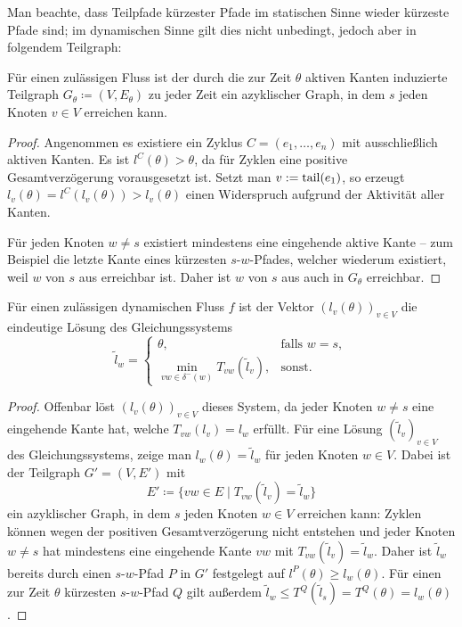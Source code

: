 Man beachte, dass Teilpfade kürzester Pfade im statischen Sinne wieder kürzeste Pfade sind; im dynamischen Sinne gilt dies nicht unbedingt, jedoch aber in folgendem Teilgraph:

\begin{lemma}\label{lemma-shortest-path-using-active-edges}
	Für einen zulässigen Fluss ist der durch die zur Zeit $\theta$ aktiven Kanten induzierte Teilgraph $G_\theta\coloneq (V, E_\theta)$ zu jeder Zeit ein azyklischer Graph, in dem $s$ jeden Knoten $v\in V$ erreichen kann.
\end{lemma}
\begin{proof}
	Angenommen es existiere ein Zyklus $C=(e_1, \dots, e_n)$ mit ausschließlich aktiven Kanten.
	Es ist $l^C(\theta) > \theta$, da für Zyklen eine positive Gesamtverzögerung vorausgesetzt ist.
	Setzt man $v:= \operatorname{tail}(e_1)$, so erzeugt $l_{v}(\theta) = l^C(l_{v}(\theta)) > l_{v}(\theta)$ einen Widerspruch aufgrund der Aktivität aller Kanten.
	
	Für jeden Knoten $w\neq s$ existiert mindestens eine eingehende aktive Kante -- zum Beispiel die letzte Kante eines kürzesten $s$-$w$-Pfades, welcher wiederum existiert, weil $w$ von $s$ aus erreichbar ist.
	Daher ist $w$ von $s$ aus auch in $G_\theta$ erreichbar.
\end{proof}

\begin{proposition}\label{prop-arrival-times-vector}
	Für einen zulässigen dynamischen Fluss $f$ ist der Vektor $(l_v(\theta))_{v\in V}$ die eindeutige Lösung des Gleichungssystems
	\[ \tilde{l}_w = \begin{cases}
	\theta, & \text{falls } w=s, \\
	\min\limits_{vw\in \delta^-(w)} T_{vw}(\tilde{l}_v), & \text{sonst}.
	\end{cases} \]
\end{proposition}
\begin{proof}
	Offenbar löst $(l_v(\theta))_{v\in V}$ dieses System, da jeder Knoten $w\neq s$ eine eingehende Kante hat, welche $T_{vw}(l_v) = l_w$ erfüllt.
	Für eine Lösung $(\tilde{l}_v)_{v\in V}$ des Gleichungssystems, zeige man $l_w(\theta) = \tilde{l}_w$ für jeden Knoten $w\in V$.
	Dabei ist der Teilgraph $G'=(V, E')$ mit
	\[ E' \coloneq  \{ vw \in E \mid T_{vw}(\tilde{l}_v ) = \tilde{l}_w \} \]
	ein azyklischer Graph, in dem $s$ jeden Knoten $w\in V$ erreichen kann:
	Zyklen können wegen der positiven Gesamtverzögerung nicht entstehen und jeder Knoten $w\neq s$ hat mindestens eine eingehende Kante $vw$ mit $T_{vw}(\tilde{l}_v) = \tilde{l}_w$.
	Daher ist $\tilde{l}_w$ bereits durch einen $s$-$w$-Pfad $P$ in $G'$ festgelegt auf $l^P(\theta)\geq l_w(\theta)$.
	Für einen zur Zeit $\theta$ kürzesten $s$-$w$-Pfad $Q$ gilt außerdem $\tilde{l}_w \leq T^Q(\tilde{l}_s) = T^Q(\theta) = l_w(\theta)$.
\end{proof}

